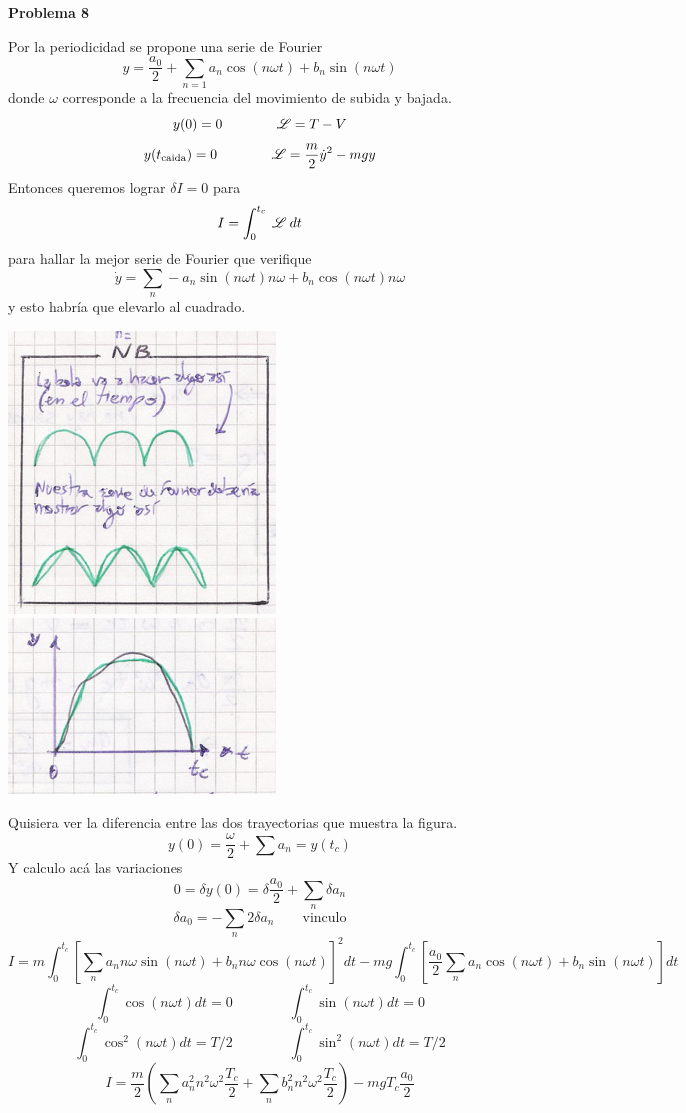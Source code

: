 \documentclass[10pt,oneside]{CBFT_book}
\begin{document}
\begin{ejemplo}{\bf Problema 8}

Por la periodicidad se propone una serie de Fourier
\[
	y = \frac{a_0 }{2} + \sum_{n=1} a_n \cos (n\omega t) + b_n \sin (n\omega t)
\]
donde $\omega$ corresponde a la frecuencia del movimiento de subida y bajada.
\[
	y(0) = 0 \qquad \qquad \mathscr{L} = T - V
\]
\[
	y(t_{\text{caida}}) = 0 \qquad \qquad \mathscr{L} = \frac m 2 \dot{y}^2 - m g y
\]
Entonces queremos lograr $\delta I = 0$ para 
\[
	I = \int_0^{t_c}  \: \mathscr{L} \: dt
\]
para hallar la mejor serie de Fourier que verifique
\[
	\dot{y} = \sum_{n} - a_n \sin (n\omega t) n \omega + b_n \cos (n\omega t) n\omega
\]
y esto habría que elevarlo al cuadrado.

\includegraphics[scale=0.3]{images/fig_mc_fourier_1.jpg}
\includegraphics[scale=0.3]{images/fig_mc_fourier_2.jpg}

Quisiera ver la diferencia entre las dos trayectorias que muestra la figura.
\[
	y(0) = \frac{ \omega }{2} + \sum a_n = y( t_c )
\]
Y calculo acá las variaciones
\[
	0 = \delta y(0) = \delta \frac{a_0}{2} + \sum_n \delta a_n
\]
\[
	\delta a_0 = - \sum_n 2 \delta a_n \qquad   \text{vinculo}
\]
\[
	I = m \int_0^{t_c} \left[ \sum_n a_n n \omega \sin( n\omega t) + b_n n\omega \cos (n\omega t) \right]^2 dt 
	- mg \int_0^{t_c} \left[ \frac {a_0} 2 \sum_n a_n \cos( n\omega t) + b_n \sin (n\omega t) \right] dt
\]
\[
	\int_0^{t_c} \cos (n\omega t) dt = 0 \qquad \qquad \int_0^{t_c} \sin (n\omega t) dt = 0
\]
\[
	\int_0^{t_c} \cos^2 (n\omega t) dt = T/2 \qquad \qquad \int_0^{t_c} \sin^2 (n\omega t) dt = T/2
\]
\[
	I = \frac m 2 \left( \sum_n a_n^2 n^2 \omega^2 \frac {T_c}2 + \sum_n b_n^2 n^2 \omega^2 \frac {T_c}2 \right) - m g T_c \frac {a_0} 2
\]


\end{ejemplo}
\end{document}
